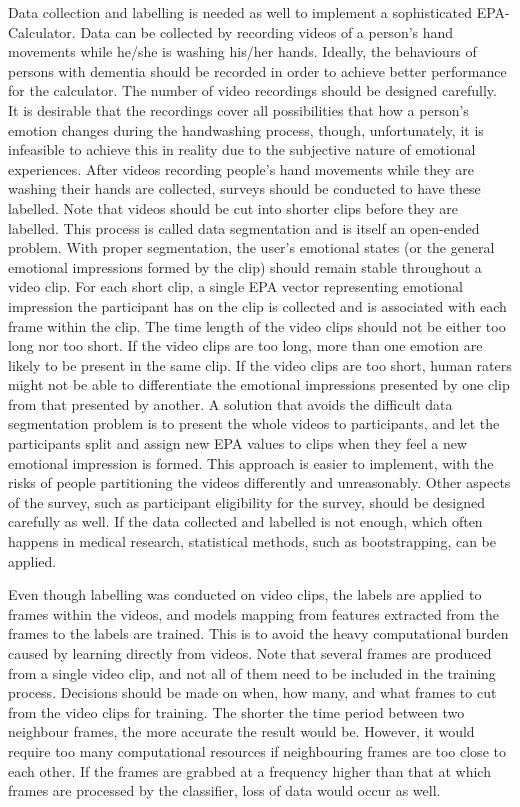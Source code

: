 \begin{enumerate}
Data collection and labelling is needed as well to implement a sophisticated EPA-Calculator. Data can be collected by recording videos of a person's hand movements while he/she is washing his/her hands. Ideally, the behaviours of persons with dementia should be recorded in order to achieve better performance for the calculator. The number of video recordings should be designed carefully. It is desirable that the recordings cover all possibilities that how a person's emotion changes during the handwashing process, though, unfortunately, it is infeasible to achieve this in reality due to the subjective nature of emotional experiences. After videos recording people's hand movements while they are washing their hands are collected, surveys should be conducted to have these labelled. Note that videos should be cut into shorter clips before they are labelled. This process is called data segmentation and is itself an open-ended problem. With proper segmentation, the user's emotional states (or the general emotional impressions formed by the clip) should remain stable throughout a video clip. For each short clip, a single EPA vector representing emotional impression the participant has on the clip is collected and is associated with each frame within the clip. The time length of the video clips should not be either too long nor too short. If the video clips are too long, more than one emotion are likely to be present in the same clip. If the video clips are too short, human raters might not be able to differentiate the emotional impressions presented by one clip from that presented by another. A solution that avoids the difficult data segmentation problem is to present the whole videos to participants, and let the participants split and assign new EPA values to clips when they feel a new emotional impression is formed. This approach is easier to implement, with the risks of people partitioning the videos differently and unreasonably. Other aspects of the survey, such as participant eligibility for the survey, should be designed carefully as well. If the data collected and labelled is not enough, which often happens in medical research, statistical methods, such as bootstrapping, can be applied. 

Even though labelling was conducted on video clips, the labels are applied to frames within the videos, and models mapping from features extracted from the frames to the labels are trained. This is to avoid the heavy computational burden caused by learning directly from videos. Note that several frames are produced from a single video clip, and not all of them need to be included in the training process. Decisions should be made on when, how many, and what frames to cut from the video clips for training. The shorter the time period between two neighbour frames, the more accurate the result would be. However, it would require too many computational resources if neighbouring frames are too close to each other. If the frames are grabbed at a frequency higher than that at which frames are processed by the classifier, loss of data would occur as well.


\end{enumerate}
